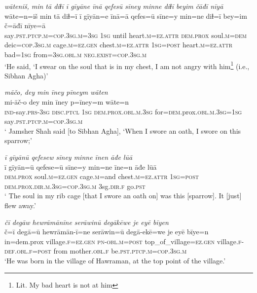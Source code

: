 \ea \label{DP.38}
\textit{wāteniš, min tā diɫī ī gīyāne īnā qefesū sīney minne diɫī beyim čāđī nīyā} \\ 
\gll wāte=n=iš min tā diɫ=ī ī gīyān=e īnā=ā qefes=ū sīne=y min=ne diɫ=ī bey=im č=āđī nīye=ā \\ 
 say\textsc{.pst}\textsc{.ptcp}\textsc{.m}\textsc{=cop}\textsc{.3sg}\textsc{.m}\textsc{=3sg} \textsc{1sg} until heart\textsc{.m}\textsc{=ez}.\textsc{attr} \textsc{dem.prox} soul\textsc{.m}\textsc{=dem} deic\textsc{=cop}\textsc{.3sg}\textsc{.m} cage\textsc{.m}\textsc{=ez}\textsc{.gen} chest\textsc{.m}\textsc{=ez}.\textsc{attr} \textsc{1sg}\textsc{=\textsc{post}} heart\textsc{.m}\textsc{=ez}.\textsc{attr} bad\textsc{=1sg} from\textsc{=3sg}\textsc{.obl}\textsc{.m} \textsc{\textsc{neg.}exist}\textsc{=cop}\textsc{.3sg}\textsc{.m} \\ 
\glt `He said, ‘I swear on the soul that is in my chest, I am not angry with him\footnote{Lit. My bad heart is not at him} (i.e., Sibhan Agha)'
\z 
 
\ea \label{DP.48}
\textit{māčo, dey min īney pīneym wāten} \\ 
\gll mi-āč-o dey min īney p=īney=m wāte=n \\ 
 \textsc{ind-}say\textsc{.prs}\textsc{-3sg} \textsc{disc.ptcl} \textsc{1sg} \textsc{dem.prox}\textsc{.obl}\textsc{.m}\textsc{.3sg} for\textsc{=dem}.prox\textsc{.obl}\textsc{.m}\textsc{.3sg}\textsc{=1sg} say\textsc{.pst}\textsc{.ptcp}\textsc{.m}\textsc{=cop}\textsc{.3sg}\textsc{.m} \\ 
\glt ` Jamsher Shah said [to Sibhan Agha], ‘When I swore an oath, I swore on this sparrow;'
\z 
 
\ea \label{DP.49}
\textit{ī gīyānū qefesew sīney minne īnen āđe lūā} \\ 
\gll ī gīyān=ū qefese=ū sīne=y min=ne īne=n āđe lūā \\ 
 \textsc{dem.prox} soul\textsc{.m}\textsc{=ez}\textsc{.gen} cage\textsc{.m}=and chest\textsc{.m}\textsc{=ez}.\textsc{attr} \textsc{1sg}\textsc{=\textsc{post}} \textsc{dem.prox}\textsc{.dir}\textsc{.m}\textsc{.3sg}\textsc{=cop}\textsc{.3sg}\textsc{.m} 3sg\textsc{.dir}\textsc{\textsc{.f}} go\textsc{.pst} \\ 
\glt ` The soul in my rib cage [that I swore an oath on] was this [sparrow]. It [just] flew away.'
\z 
 
\ea \label{ZP.3}
\textit{čī degāw hewrāmānīne serāwinū degākēwe je eyē bīyen} \\ 
\gll č=ī degā=ū hewrāmān-ī=ne serāwin=ū degā-ekē=we je eyē bīye=n \\ 
 in=dem.prox village\textsc{.f}\textsc{\textsc{=ez.gen}} \textsc{pn}\textsc{-obl}\textsc{.m}\textsc{=\textsc{post}} top\_of\_village\textsc{\textsc{=ez.gen}} village\textsc{.f}\textsc{-def}\textsc{.obl}\textsc{.f}\textsc{=\textsc{post}} from mother\textsc{.obl}\textsc{.f} be\textsc{.pst}\textsc{.ptcp}\textsc{.m}\textsc{=cop}\textsc{.3sg}\textsc{.m} \\ 
\glt `He was born in the village of Hawraman, at the top point of the village.'
\z 
 
